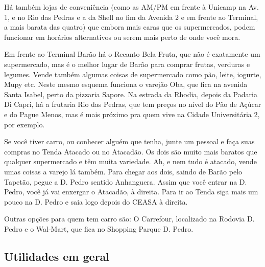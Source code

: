 Há também lojas de conveniência (como as AM/PM em frente à Unicamp na Av. 1,
e no Rio das Pedras e a da Shell no fim da Avenida 2 e em frente ao Terminal,
a mais barata das quatro) que embora mais caras que os supermercados, podem funcionar
em horários alternativos ou serem mais perto de onde você mora.

Em frente ao Terminal Barão há o Recanto Bela Fruta, que não é exatamente um
supermercado, mas é o melhor lugar de Barão para comprar frutas, verduras
e legumes. Vende também algumas coisas de supermercado como pão, leite, iogurte,
Mupy etc. Neste mesmo esquema funciona o varejão Oba, que fica na avenida Santa
Isabel, perto da pizzaria Sapore. Na estrada da Rhodia, depois da Padaria Di
Capri, há a frutaria Rio das Pedras, que tem preços no nível do Pão de Açúcar
e do Pague Menos, mas é mais próximo pra quem vive na Cidade Universitária 2,
por exemplo.

Se você tiver carro, ou conhecer alguém que tenha, junte um pessoal e faça suas
compras no Tenda Atacado ou no Atacadão. Os dois são muito mais baratos que
qualquer supermercado e têm muita variedade. Ah, e nem tudo é atacado, vende
umas coisas a varejo lá também. Para chegar aos dois, saindo de Barão pelo
Tapetão, pegue a D. Pedro sentido Anhanguera. Assim que você entrar na D. Pedro,
você já vai enxergar o Atacadão, à direita. Para ir ao Tenda siga mais um pouco
na D.  Pedro e saia logo depois do CEASA à direita.

Outras opções para quem tem carro são: O Carrefour, localizado na Rodovia D.
Pedro e o Wal-Mart, que fica no Shopping Parque D. Pedro.

\subsection{Utilidades em geral}

